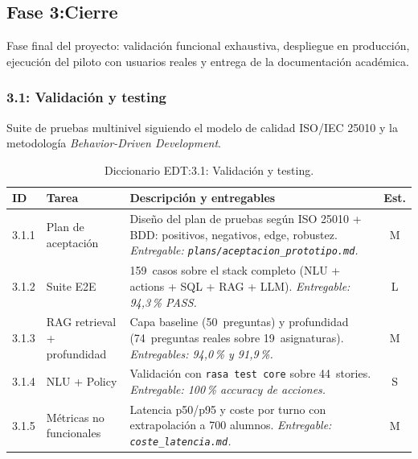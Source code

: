 \subsection{Fase 3:Cierre}\label{subsec:fase-cierre}

Fase final del proyecto: validación funcional exhaustiva, despliegue en producción, ejecución del piloto con usuarios reales y entrega de la documentación académica.

\subsubsection{3.1: Validación y testing}\label{subsubsec:testing}

Suite de pruebas multinivel siguiendo el modelo de calidad ISO/IEC 25010 y la metodología \textit{Behavior-Driven Development}.

\begin{table}[hbtp]
\centering
\small
\begin{tabular}{|l|l|p{7.5cm}|c|}
\hline
\textbf{ID} & \textbf{Tarea} & \textbf{Descripción y entregables} & \textbf{Est.} \\ \hline
3.1.1 & Plan de aceptación & Diseño del plan de pruebas según ISO 25010 + BDD: positivos, negativos, edge, robustez. \textit{Entregable: \texttt{plans/aceptacion\_prototipo.md}.} & M \\ \hline
3.1.2 & Suite E2E & 159~casos sobre el stack completo (NLU + actions + SQL + RAG + LLM). \textit{Entregable: 94{,}3\,\% PASS.} & L \\ \hline
3.1.3 & RAG retrieval + profundidad & Capa baseline (50~preguntas) y profundidad (74~preguntas reales sobre 19~asignaturas). \textit{Entregables: 94{,}0\,\% y 91{,}9\,\%.} & M \\ \hline
3.1.4 & NLU + Policy & Validación con \texttt{rasa test core} sobre 44~stories. \textit{Entregable: 100\,\% accuracy de acciones.} & S \\ \hline
3.1.5 & Métricas no funcionales & Latencia p50/p95 y coste por turno con extrapolación a 700 alumnos. \textit{Entregable: \texttt{coste\_latencia.md}.} & M \\ \hline
\end{tabular}
\caption{Diccionario EDT:3.1: Validación y testing.}
\label{tab:dict-3-1}
\end{table}

